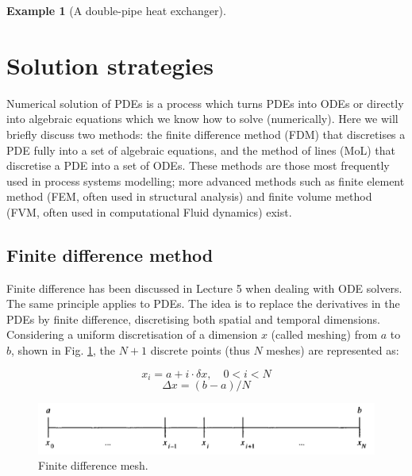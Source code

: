 \documentclass[a4paper,11pt]{article}
\theoremstyle{definition}
\newtheorem{exmp}{Example}[section]
\begin{document}
\begin{exmp}[A double-pipe heat exchanger]
\end{exmp}


\section{Solution strategies}

Numerical solution of PDEs is a process which turns PDEs into ODEs or directly into algebraic equations 
which we know how to solve (numerically). Here we will briefly discuss two methods:
the finite difference method (FDM) that discretises a PDE fully into a set of algebraic equations,
and the method of lines (MoL) that discretise a PDE into a set of ODEs.
These methods are those most frequently used in process systems modelling; more advanced methods such as finite element method 
(FEM, often used in structural analysis) and finite volume method (FVM, often used in computational Fluid dynamics) exist.

\subsection*{Finite difference method}

Finite difference has been discussed in Lecture 5 when dealing with ODE solvers.
The same principle applies to PDEs. The idea is to replace the derivatives in the PDEs by finite difference,
discretising both spatial and temporal dimensions. 
Considering a uniform discretisation of a dimension $x$ (called meshing) from $a$ to $b$, 
shown in Fig. \ref{fig:fdm}, the $N+1$ discrete points (thus $N$ meshes) are represented as:

\[ x_i = a + i \cdot \delta x, \quad 0 < i < N \]
\[ \Delta x = (b - a)/N \]

\begin{figure} [!h]
 \begin{center}
	\includegraphics[width=.7\textwidth]{fdm}
 \end{center}
 \caption{Finite difference mesh.} 
 \label{fig:fdm}
\end{figure}
\end{document}
